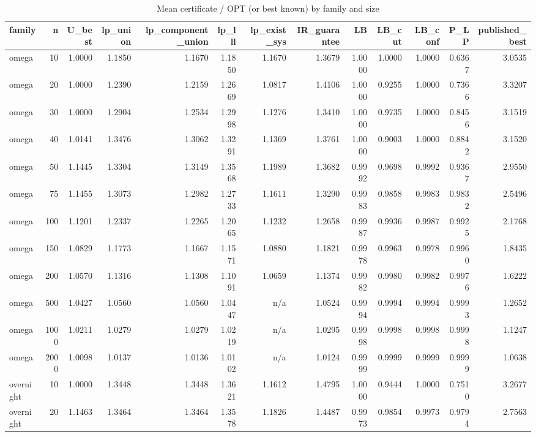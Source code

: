 \begin{table}[htbp]
\centering
\small
\caption{Mean certificate / OPT (or best known) by family and size}
\label{tab:E1_certificates_ratios_by_group}
\begin{tabular}{lrrrrrrrrrrrr}
\toprule
family & n & U\_best & lp\_union & lp\_component\_union & lp\_lll & lp\_exist\_sys & IR\_guarantee & LB & LB\_cut & LB\_conf & P\_LP & published\_best \\
\midrule
omega & 10 & 1.0000 & 1.1850 & 1.1670 & 1.1850 & 1.1670 & 1.3679 & 1.0000 & 1.0000 & 1.0000 & 0.6367 & 3.0535 \\
omega & 20 & 1.0000 & 1.2390 & 1.2159 & 1.2669 & 1.0817 & 1.4106 & 1.0000 & 0.9255 & 1.0000 & 0.7366 & 3.3207 \\
omega & 30 & 1.0000 & 1.2904 & 1.2534 & 1.2998 & 1.1276 & 1.3410 & 1.0000 & 0.9735 & 1.0000 & 0.8456 & 3.1519 \\
omega & 40 & 1.0141 & 1.3476 & 1.3062 & 1.3291 & 1.1369 & 1.3761 & 1.0000 & 0.9003 & 1.0000 & 0.8842 & 3.1520 \\
omega & 50 & 1.1445 & 1.3304 & 1.3149 & 1.3568 & 1.1989 & 1.3682 & 0.9992 & 0.9698 & 0.9992 & 0.9367 & 2.9550 \\
omega & 75 & 1.1455 & 1.3073 & 1.2982 & 1.2733 & 1.1611 & 1.3290 & 0.9983 & 0.9858 & 0.9983 & 0.9832 & 2.5496 \\
omega & 100 & 1.1201 & 1.2337 & 1.2265 & 1.2065 & 1.1232 & 1.2658 & 0.9987 & 0.9936 & 0.9987 & 0.9925 & 2.1768 \\
omega & 150 & 1.0829 & 1.1773 & 1.1667 & 1.1571 & 1.0880 & 1.1821 & 0.9978 & 0.9963 & 0.9978 & 0.9960 & 1.8435 \\
omega & 200 & 1.0570 & 1.1316 & 1.1308 & 1.1091 & 1.0659 & 1.1374 & 0.9982 & 0.9980 & 0.9982 & 0.9976 & 1.6222 \\
omega & 500 & 1.0427 & 1.0560 & 1.0560 & 1.0447 & n/a & 1.0524 & 0.9994 & 0.9994 & 0.9994 & 0.9993 & 1.2652 \\
omega & 1000 & 1.0211 & 1.0279 & 1.0279 & 1.0219 & n/a & 1.0295 & 0.9998 & 0.9998 & 0.9998 & 0.9998 & 1.1247 \\
omega & 2000 & 1.0098 & 1.0137 & 1.0136 & 1.0102 & n/a & 1.0124 & 0.9999 & 0.9999 & 0.9999 & 0.9999 & 1.0638 \\
overnight & 10 & 1.0000 & 1.3448 & 1.3448 & 1.3621 & 1.1612 & 1.4795 & 1.0000 & 0.9444 & 1.0000 & 0.7510 & 3.2677 \\
overnight & 20 & 1.1463 & 1.3464 & 1.3464 & 1.3578 & 1.1826 & 1.4487 & 0.9973 & 0.9854 & 0.9973 & 0.9794 & 2.7563 \\

\end{tabular}
\end{table}
